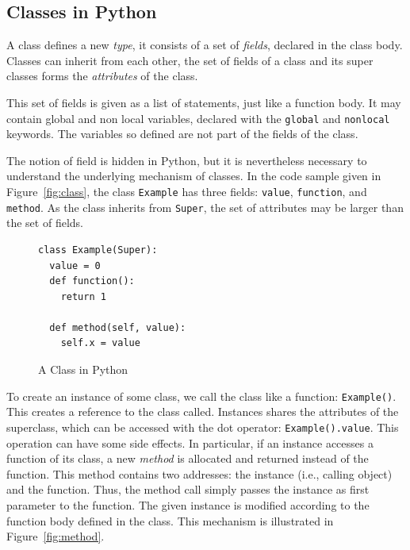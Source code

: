 \documentclass[submission,copyright,creativecommons]{eptcs}
\begin{document}
\subsection{Classes in Python}
A class defines a new \emph{type}, it consists of a set of \emph{fields}, declared in the class body.
Classes can inherit from each other, the set of fields of a class and its super classes forms the \emph{attributes} of the class.

This set of fields is given as a list of statements, just like a function body.
It may contain global and non local variables, declared with the \texttt{global} and \texttt{nonlocal} keywords.
The variables so defined are not part of the fields of the class.

The notion of field is hidden in Python, but it is nevertheless necessary to understand the underlying mechanism of classes.
In the code sample given in Figure~\vref{fig:class}, the class \texttt{Example} has three fields: \texttt{value}, \texttt{function}, and \texttt{method}.
As the class inherits from \texttt{Super}, the set of attributes may
be larger than the set of fields.

\begin{figure}[ht]
  \centering
  \begin{minipage}{0.25\textwidth}
    \begin{verbatim}
class Example(Super):
  value = 0
  def function():
    return 1

  def method(self, value):
    self.x = value
    \end{verbatim}
  \end{minipage}
  \caption{\label{fig:class}A Class in Python}
\end{figure}

To create an instance of some class, we call the class like a function: \texttt{Example()}.
This creates a reference to the class called.
Instances shares the attributes of the superclass, which can be accessed with the dot operator: \texttt{Example().value}.
This operation can have some side effects.
In particular, if an instance accesses a function of its class, a new \emph{method} is allocated and returned instead of the function.
This method contains two addresses: the instance (i.e., calling object) and the function.
Thus, the method call simply passes the instance as first parameter to the function.
The given instance is modified according to the function body defined in the class.
This mechanism is illustrated in Figure~\ref{fig:method}.
\end{document}
